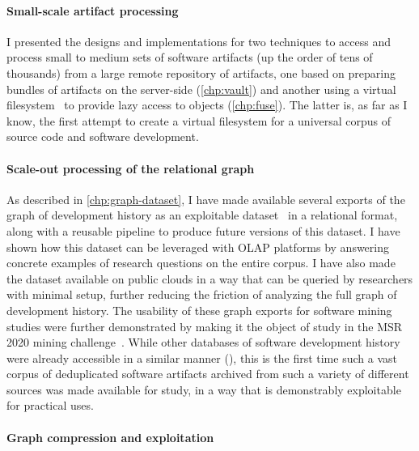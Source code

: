 \paragraph*{Small-scale artifact processing}

I presented the designs and implementations for two techniques to access and
process small to medium sets of software artifacts (up the order of tens of
thousands) from a large remote repository of artifacts, one based on preparing
bundles of artifacts on the server-side (\cref{chp:vault}) and another using a
virtual filesystem~\cite{swh-2021-swhfs} to provide lazy access to objects
(\cref{chp:fuse}). The latter is, as far as I know, the first attempt to create
a virtual filesystem for a universal corpus of source code and software
development.

\paragraph*{Scale-out processing of the relational graph}

As described in \cref{chp:graph-dataset}, I have made available several exports
of the graph of development history as an exploitable
dataset~\cite{swh-msr2019-dataset} in a relational format, along with a
reusable pipeline to produce future versions of this dataset. I have shown how
this dataset can be leveraged with \gls{OLAP} platforms by answering concrete
examples of research questions on the entire corpus. I have also made the
dataset available on public clouds in a way that can be queried by researchers
with minimal setup, further reducing the friction of analyzing the full graph
of development history. The usability of these graph exports for software
mining studies were further demonstrated by making it the object of study in
the MSR 2020 mining challenge~\cite{msr-2020-challenge}.  While other databases
of software development history were already accessible in a similar manner
(\cite{GHTorrent,web:github-activity-data,mockus2019woc}), this is the first
time such a vast corpus of deduplicated software artifacts archived from such a
variety of different sources was made available for study, in a way that is
demonstrably exploitable for practical uses.

\paragraph*{Graph compression and exploitation}

